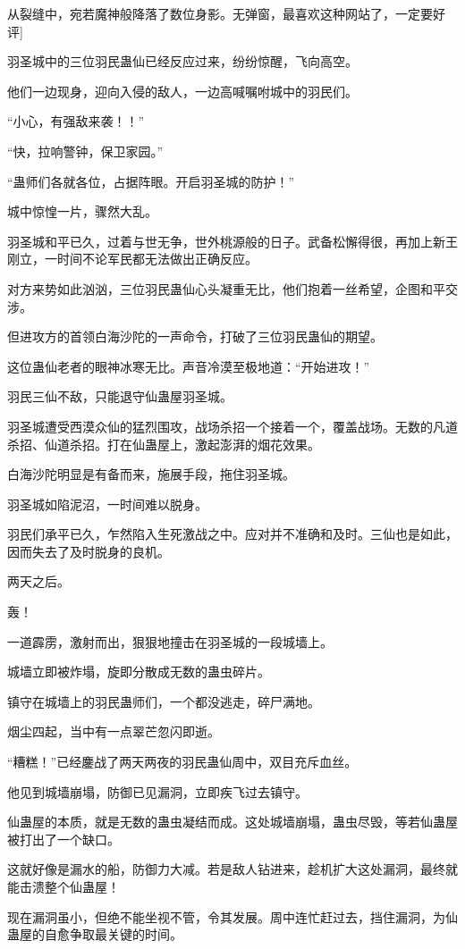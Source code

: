 \begin{this_body}
从裂缝中，宛若魔神般降落了数位身影。无弹窗，最喜欢这种网站了，一定要好评]

羽圣城中的三位羽民蛊仙已经反应过来，纷纷惊醒，飞向高空。

他们一边现身，迎向入侵的敌人，一边高喊嘱咐城中的羽民们。

“小心，有强敌来袭！！”

“快，拉响警钟，保卫家园。”

“蛊师们各就各位，占据阵眼。开启羽圣城的防护！”

城中惊惶一片，骤然大乱。

羽圣城和平已久，过着与世无争，世外桃源般的日子。武备松懈得很，再加上新王刚立，一时间不论军民都无法做出正确反应。

对方来势如此汹汹，三位羽民蛊仙心头凝重无比，他们抱着一丝希望，企图和平交涉。

但进攻方的首领白海沙陀的一声命令，打破了三位羽民蛊仙的期望。

这位蛊仙老者的眼神冰寒无比。声音冷漠至极地道：“开始进攻！”

羽民三仙不敌，只能退守仙蛊屋羽圣城。

羽圣城遭受西漠众仙的猛烈围攻，战场杀招一个接着一个，覆盖战场。无数的凡道杀招、仙道杀招。打在仙蛊屋上，激起澎湃的烟花效果。

白海沙陀明显是有备而来，施展手段，拖住羽圣城。

羽圣城如陷泥沼，一时间难以脱身。

羽民们承平已久，乍然陷入生死激战之中。应对并不准确和及时。三仙也是如此，因而失去了及时脱身的良机。

两天之后。

轰！

一道霹雳，激射而出，狠狠地撞击在羽圣城的一段城墙上。

城墙立即被炸塌，旋即分散成无数的蛊虫碎片。

镇守在城墙上的羽民蛊师们，一个都没逃走，碎尸满地。

烟尘四起，当中有一点翠芒忽闪即逝。

“糟糕！”已经鏖战了两天两夜的羽民蛊仙周中，双目充斥血丝。

他见到城墙崩塌，防御已见漏洞，立即疾飞过去镇守。

仙蛊屋的本质，就是无数的蛊虫凝结而成。这处城墙崩塌，蛊虫尽毁，等若仙蛊屋被打出了一个缺口。

这就好像是漏水的船，防御力大减。若是敌人钻进来，趁机扩大这处漏洞，最终就能击溃整个仙蛊屋！

现在漏洞虽小，但绝不能坐视不管，令其发展。周中连忙赶过去，挡住漏洞，为仙蛊屋的自愈争取最关键的时间。


\end{this_body}
